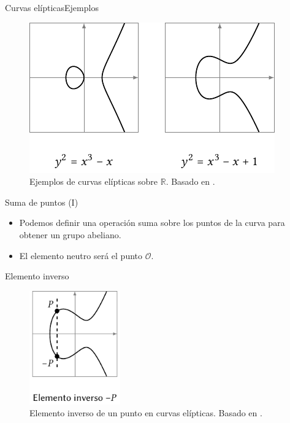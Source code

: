 \documentclass[spanish]{beamer}
\begin{document}
\begin{frame}[fragile]{Curvas elípticas}{Ejemplos}
  \begin{figure}[h]
    \centering
    \includegraphics[width=.75\textwidth]{img/ejemplos-curvas}
    \caption{Ejemplos de curvas elípticas sobre $\mathbb{R}$. Basado en \parencite{eichlseder_elliptic_2016}.}
    \label{fig:curva}
  \end{figure}
\end{frame}

\begin{frame}{Suma de puntos (I)}
  \begin{itemize}
    \item Podemos definir una operación suma sobre los puntos de la curva para obtener un grupo abeliano.
    \item El elemento neutro será el punto \(\mathcal{O}\).
  \end{itemize}
\end{frame}

\begin{frame}{Elemento inverso}
  \begin{figure}[h]
    \centering
    \includegraphics[width=0.35\textwidth]{img/inverso-curvas}
    \caption{Elemento inverso de un punto en curvas elípticas. Basado en  \parencite{eichlseder_elliptic_2016}.}
    \label{fig:inverso-curvas}
  \end{figure}  
\end{frame}
\end{document}
